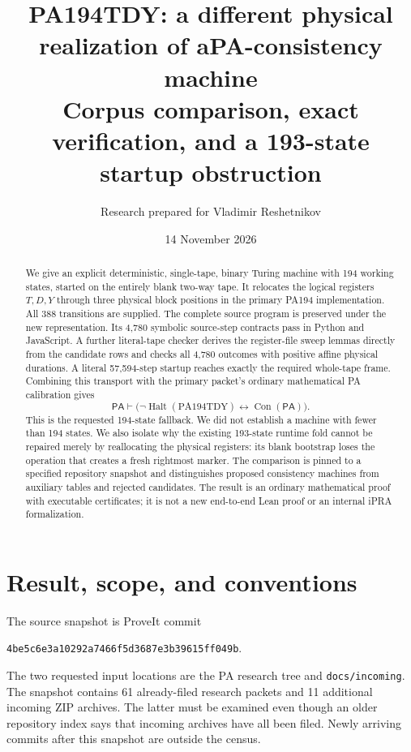 \documentclass[11pt]{article}
\title{PA194TDY: a different physical realization of a\newline PA-consistency machine\\[0.5em]\large Corpus comparison, exact verification, and a 193-state startup obstruction}
\author{Research prepared for Vladimir Reshetnikov}
\date{14 November 2026}
\newcommand{\PA}{\mathsf{PA}}
\newcommand{\Con}{\operatorname{Con}}
\newcommand{\Halt}{\operatorname{Halt}}
\newcommand{\file}[1]{\nolinkurl{#1}}
\begin{document}
\maketitle
\begin{abstract}
We give an explicit deterministic, single-tape, binary Turing machine with
194 working states, started on the entirely blank two-way tape. It relocates
the logical registers $T,D,Y$ through three physical block positions in the
primary PA194 implementation. All 388 transitions are supplied. The complete
source program is preserved under the new representation. Its 4,780 symbolic
source-step contracts pass in Python and JavaScript. A further literal-tape
checker derives the register-file sweep lemmas directly from the candidate
rows and checks all 4,780 outcomes with positive affine physical durations.
A literal 57,594-step startup reaches exactly the required whole-tape frame.
Combining this transport with the primary packet's ordinary mathematical PA
calibration gives
\[
 \PA\vdash \bigl(\neg\Halt(\mathrm{PA194TDY})\leftrightarrow\Con(\PA)\bigr).
\]
This is the requested 194-state fallback. We did not establish a machine with
fewer than 194 states. We also isolate why the existing 193-state runtime
fold cannot be repaired merely by reallocating the physical registers: its
blank bootstrap loses the operation that creates a fresh rightmost marker.
The comparison is pinned to a specified repository snapshot and distinguishes
proposed consistency machines from auxiliary tables and rejected candidates.
The result is an ordinary mathematical proof with executable certificates;
it is not a new end-to-end Lean proof or an internal iPRA formalization.
\end{abstract}

\section{Result, scope, and conventions}

The source snapshot is ProveIt commit
\begin{center}\small\texttt{4be5c6e3a10292a7466f5d3687e3b39615ff049b}.\end{center}
The two requested input locations are the PA research tree and
\file{docs/incoming}. The snapshot contains 61 already-filed research packets
and 11 additional incoming ZIP archives. The latter must be examined even
though an older repository index says that incoming archives have all been
filed. Newly arriving commits after this snapshot are outside the census.
\end{document}
